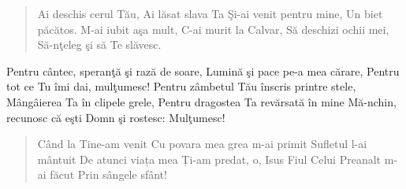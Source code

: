 
\begin{verse}
	Ai deschis cerul Tău,
	Ai lăsat slava Ta
	Şi-ai venit pentru mine,
	Un biet păcătos.
	M-ai iubit aşa mult,
	C-ai murit la Calvar,
	Să deschizi ochii mei,
	Să-nţeleg şi să Te slăvesc.
\end{verse}

\begin{chorus}
	Pentru cântec, speranţă şi rază de soare,
	Lumină şi pace pe-a mea cărare,
	Pentru tot ce Tu îmi dai, mulţumesc!
	Pentru zâmbetul Tău înscris printre stele,
	Mângâierea Ta în clipele grele,
	Pentru dragostea Ta revărsată în mine
	Mă-nchin, recunosc că eşti Domn şi rostesc:
	Mulţumesc!
\end{chorus}

\begin{verse}
	Când la Tine-am venit
	Cu povara mea grea m-ai primit
	Sufletul l-ai mântuit
	De atunci viața mea
	Ți-am predat, o, Isus
	Fiul Celui Preanalt m-ai făcut
	Prin sângele sfânt!
\end{verse}

\endsong